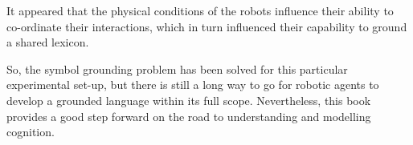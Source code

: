 It appeared that the physical conditions of the robots influence their ability to co-ordinate their interactions, which in turn influenced their capability to ground a shared lexicon.

So, the symbol grounding problem has been solved for this particular experimental set-up, but there is still a long way to go for robotic agents to develop a grounded language within its full scope. Nevertheless, this book provides a good step forward on the road to understanding and modelling cognition.






